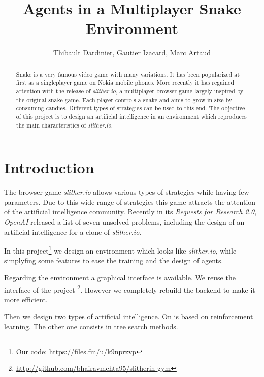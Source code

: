 \documentclass[journal, a4paper]{IEEEtran}
\begin{document}
\title{Agents in a Multiplayer Snake Environment}
\author{Thibault Dardinier, Gautier Izacard, Marc Artaud}
\maketitle

\begin{abstract}
Snake is a very famous video game with many variations. It has been popularized at first as a singleplayer game on Nokia mobile phones. More recently it has regained attention with the release of \emph{slither.io}, a multiplayer browser game largely inspired by the original snake game. Each player controls a snake and aims to grow in size by consuming candies. Different types of strategies can be used to this end. The objective of this project is to design an artificial intelligence in an environment which reproduces the main characteristics of \emph{slither.io}.

\end{abstract}

\section{Introduction}
The browser game \emph{slither.io} allows various types of strategies while having few parameters. Due to this wide range of strategies this game attracts the attention of the artificial intelligence community. Recently in its \emph{Requests for Research 2.0}, \emph{OpenAI} released a list of seven unsolved problems, including the design of an artificial intelligence for a clone of \emph{slither.io}.

In this project\footnote{Our code: \url{https://files.fm/u/k9nprzvp}}
we design an environment which looks like \emph{slither.io}, while simplyfing some features to ease the training and the design of agents. 

Regarding the environment a graphical interface is available. We reuse the interface of the project 
\footnote{\url{http://github.com/bhairavmehta95/slitherin-gym}}. However we completely rebuild the backend to make it more efficient. 

Then we design two types of artificial intelligence. On is based on reinforcement learning. The other one consists in tree search methods.
\end{document}
